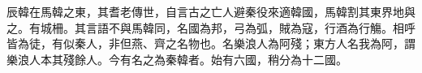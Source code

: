 \begin{pinyinscope}
 
 
 辰韓在馬韓之東，其耆老傳世，自言古之亡人避秦役來適韓國，馬韓割其東界地與之。有城柵。其言語不與馬韓同，名國為邦，弓為弧，賊為寇，行酒為行觴。相呼皆為徒，有似秦人，非但燕、齊之名物也。名樂浪人為阿殘；東方人名我為阿，謂樂浪人本其殘餘人。今有名之為秦韓者。始有六國，稍分為十二國。
 
 
\end{pinyinscope}